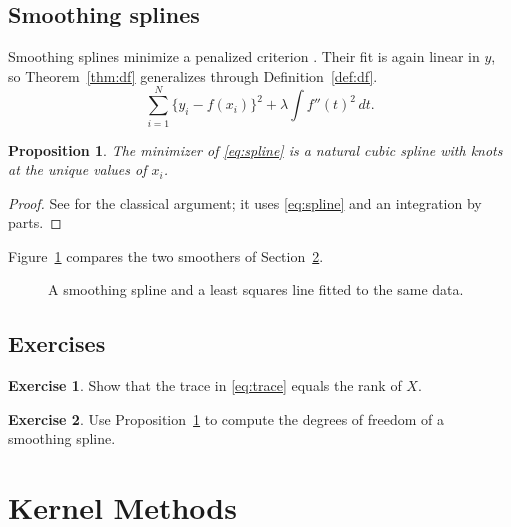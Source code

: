 \documentclass[11pt]{book}
\newtheorem{proposition}[theorem]{Proposition}
\theoremstyle{definition}
\newtheorem{exercise}{Exercise}[chapter]
\numberwithin{equation}{chapter}
\begin{document}
\section{Smoothing splines}
Smoothing splines minimize a penalized criterion \citep{reinsch1967, wahba1990}. Their fit is again linear in $y$, so Theorem~\ref{thm:df} generalizes through Definition~\ref{def:df}.
\begin{equation}\label{eq:spline}
\sum_{i=1}^{N} \{y_i - f(x_i)\}^2 + \lambda \int f''(t)^2\, dt .
\end{equation}
\begin{proposition}\label{prop:spline}
The minimizer of \eqref{eq:spline} is a natural cubic spline with knots at the unique values of $x_i$.
\end{proposition}
\begin{proof}
See \citet{wahba1990} for the classical argument; it uses \eqref{eq:spline} and an integration by parts.
\end{proof}
Figure~\ref{fig:smoother} compares the two smoothers of Section~\ref{sec:exercises}.
\begin{figure}[h]
\centering
\fbox{\rule{0pt}{0.8in}\hspace{2.6in}}
\caption{A smoothing spline and a least squares line fitted to the same data.}
\label{fig:smoother}
\end{figure}
\section{Exercises}\label{sec:exercises}
\begin{exercise}\label{ex:trace}
Show that the trace in \eqref{eq:trace} equals the rank of $X$.
\end{exercise}
\begin{exercise}
Use Proposition~\ref{prop:spline} to compute the degrees of freedom of a smoothing spline.
\end{exercise}

\chapter{Kernel Methods}
\end{document}

